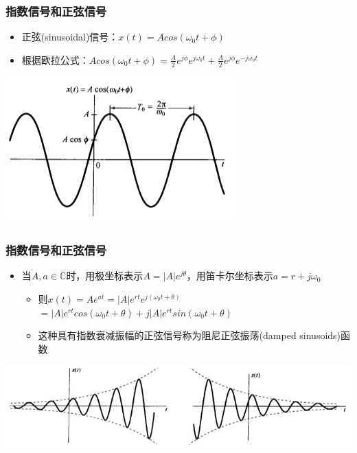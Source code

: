 \documentclass[CJKutf8,xcolor=pdftex,dvipsnames,table]{beamer}
\begin{document}
\begin{CJK*}{UTF8}{song}
  \begin{frame}
    \frametitle{指数信号和正弦信号}
    \begin{itemize}
    \item 正弦(sinusoidal)信号：$x(t)=Acos(\omega_0 t + \phi)$
    \item 根据欧拉公式：$Acos(\omega_0 t + \phi)=\frac{A}{2}e^{j\phi}e^{j\omega_0 t}+\frac{A}{2}e^{j\phi}e^{-j\omega_0 t}$
    \end{itemize}
    \begin{center}
      \includegraphics[scale=.5]{ccossinusoid}
    \end{center}  
  \end{frame} 

  \begin{frame}
    \frametitle{指数信号和正弦信号}
    \begin{itemize}
    \item 当$A, a \in \mathbb{C}$时，用极坐标表示$A=|A|e^{j\theta}$，用笛卡尔坐标表示$a=r+j\omega_0$
    \begin{itemize}
    \item 则$x(t)=Ae^{at}=|A|e^{rt}e^{j(\omega_0 t+\theta)}$
    \\ $=|A|e^{rt}cos(\omega_0 t + \theta)+j|A|e^{rt}sin(\omega_0 t + \theta)$
    \item 这种具有指数衰减振幅的正弦信号称为阻尼正弦振荡(damped sinusoids)函数
    \end{itemize}
    \end{itemize}
    \begin{center}
      \includegraphics[scale=.5]{dampedsinusoids}
    \end{center}  
  \end{frame} 


\end{CJK*}
\end{document}
